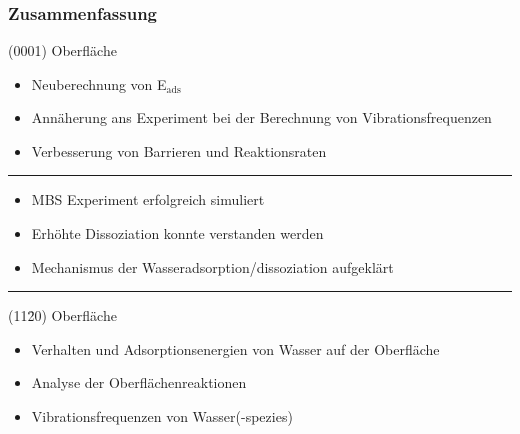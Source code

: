 \documentclass[hyperref={pdfpagelabels=false}]{beamer}
\begin{document}
\begin{frame}
\begin{columns}
\begin{center}
 \end{center}
 \end{columns}
 \newline~\newline~\newline
{}
\end{frame}


\section*{}
\begin{frame}
 \frametitle{Zusammenfassung}
 {\color{blue}(0001) Oberfläche}
\begin{itemize}
 \item Neuberechnung von E$_{\textrm{ads}}$ 
 \item Annäherung ans Experiment bei der Berechnung von Vibrationsfrequenzen
 \item Verbesserung von Barrieren und Reaktionsraten
\end{itemize}
 \pause\hrule
\begin{itemize}
 \item MBS Experiment erfolgreich simuliert
 \item Erhöhte Dissoziation konnte verstanden werden
 \item Mechanismus der Wasseradsorption/dissoziation aufgeklärt
\end{itemize}
 \pause\hrule
 {\color{blue}(11\=20) Oberfläche}
\begin{itemize}
 \item Verhalten und Adsorptionsenergien von Wasser auf der Oberfläche
 \item Analyse der Oberflächenreaktionen
 \item Vibrationsfrequenzen von Wasser(-spezies)
\end{itemize}
 \end{frame}
\end{document}
